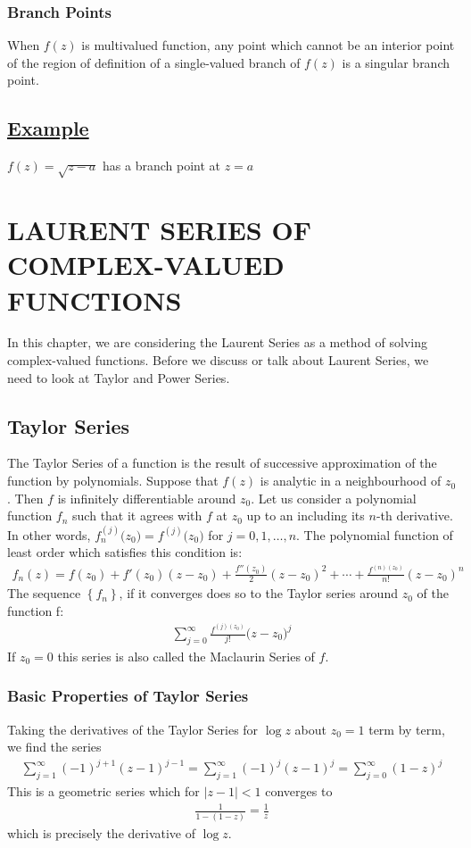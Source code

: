 \documentclass[12pt]{report}
\newcommand{\ubt}[1]{\textbf{\underline{#1}}}
\newcommand{\sprime}{'}
\newcommand{\dprime}{''}
\newcommand{\dsp}{\displaystyle}
\newcommand{\example}[1]{\section*{\ubt{Example #1}}}
\begin{document}
	\subsection{Branch Points}
	When $f(z)$ is multivalued function, any point which cannot be an interior point of the region of definition of a single-valued branch of $f(z)$ is a singular branch point.
	\example{}
	$\dsp f(z)=\sqrt{z-a}$ has a branch point at $z=a$


	\chapter{LAURENT SERIES OF COMPLEX-VALUED FUNCTIONS}
	In this chapter, we are considering the Laurent Series as a method of solving complex-valued functions. Before we discuss or talk about Laurent Series, we need to look at Taylor and Power Series.
	
	\section{Taylor Series}
	The Taylor Series of a function is the result of successive approximation of the function by polynomials. Suppose that $f(z)$ is analytic in a neighbourhood of $z_0$. Then $f$ is infinitely differentiable around $z_0$. Let us consider a polynomial function $f_n$ such that it agrees with $f$ at $z_0$ up to an including its $n$-th derivative. In other words, $f_n^{(j)}\Big(z_0\Big)=f^{(j)}\Big(z_0\Big)$ for $j=0,1,\ldots,n$. The polynomial function of least order which satisfies this condition is:
	\begin{eqnarray}
		f_n(z) = f(z_0) + f\sprime(z_0)(z-z_0)+\frac{f\dprime(z_0)}{2}(z-z_0)^2 + \cdots + \frac{f^{(n)(z_0)}}{n!}(z-z_0)^n
	\end{eqnarray}
	The sequence $\left\{f_n\right\}$, if it converges does so to the Taylor series around $z_0$ of the function f:
	\begin{eqnarray}
		\sum_{j=0}^{\infty}\frac{f^{(j)(z_0)}}{j!}\Big(z-z_0\Big)^j
	\end{eqnarray}
	If $z_0=0$ this series is also called the Maclaurin Series of $f$.
	
	\subsection{Basic Properties of Taylor Series}
	Taking the derivatives of the Taylor Series for $\log z$ about $z_0=1$ term by term, we find the series
	\begin{eqnarray}
		\sum_{j=1}^{\infty}(-1)^{j+1}(z-1)^{j-1} = \sum_{j=1}^{\infty}(-1)^j(z-1)^j = \sum_{j=0}^{\infty}(1-z)^j
	\end{eqnarray} 
	This is a geometric series which for $|z-1|< 1$ converges to
	\begin{eqnarray}
		\frac{1}{1-(1-z)} = \frac{1}{z}
	\end{eqnarray}
	which is precisely the derivative of $\log z$.
	
\end{document}

